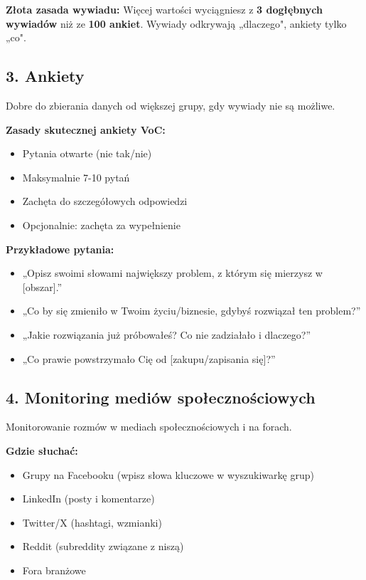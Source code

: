 \documentclass[
  12pt,
  a4paper,
  twoside,
  openright,
  12pt,
  DIV=12,
  BCOR=12mm]{scrbook}
\providecommand{\tightlist}{%
  \setlength{\itemsep}{0pt}\setlength{\parskip}{0pt}}\usepackage{longtable,booktabs,array}
\begin{document}
\begin{wazne}
\textbf{Złota zasada wywiadu:} Więcej wartości wyciągniesz z \textbf{3 dogłębnych wywiadów} niż ze \textbf{100 ankiet}. Wywiady odkrywają „dlaczego", ankiety tylko „co".
\end{wazne}

\subsection{3. Ankiety}\label{ankiety}

Dobre do zbierania danych od większej grupy, gdy wywiady nie są możliwe.

\textbf{Zasady skutecznej ankiety VoC:}

\begin{itemize}
\tightlist
\item
  Pytania otwarte (nie tak/nie)
\item
  Maksymalnie 7-10 pytań
\item
  Zachęta do szczegółowych odpowiedzi
\item
  Opcjonalnie: zachęta za wypełnienie
\end{itemize}

\textbf{Przykładowe pytania:}

\begin{itemize}
\tightlist
\item
  „Opisz swoimi słowami największy problem, z którym się mierzysz w
  {[}obszar{]}.''
\item
  „Co by się zmieniło w Twoim życiu/biznesie, gdybyś rozwiązał ten
  problem?''
\item
  „Jakie rozwiązania już próbowałeś? Co nie zadziałało i dlaczego?''
\item
  „Co prawie powstrzymało Cię od {[}zakupu/zapisania się{]}?''
\end{itemize}

\subsection{4. Monitoring mediów
społecznościowych}\label{monitoring-mediuxf3w-spoux142ecznoux15bciowych}

Monitorowanie rozmów w mediach społecznościowych i na forach.

\textbf{Gdzie słuchać:}

\begin{itemize}
\tightlist
\item
  Grupy na Facebooku (wpisz słowa kluczowe w wyszukiwarkę grup)
\item
  LinkedIn (posty i komentarze)
\item
  Twitter/X (hashtagi, wzmianki)
\item
  Reddit (subreddity związane z niszą)
\item
  Fora branżowe
\end{itemize}
\end{document}
